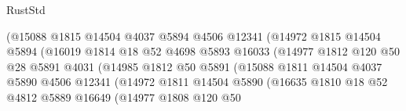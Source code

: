 \begin{lexlean}{RustStd}
\begin{coremodule}
                                    (@15088
                                      @1815
                                      @14504
                                      @4037
                                      @5894
                                      @4506
                                      @12341
                                      (@14972
                                        @1815
                                        @14504
                                        @5894
                                        (@16019
                                          @1814
                                          @18
                                          @52
                                          @4698
                                          @5893
                                          @16033
                                          (@14977
                                            @1812
                                            @120
                                            @50
                                            @28
                                            @5891
                                            @4031
                                            (@14985
                                              @1812
                                              @50
                                              @5891
                                              (@15088
                                                @1811
                                                @14504
                                                @4037
                                                @5890
                                                @4506
                                                @12341
                                                (@14972
                                                  @1811
                                                  @14504
                                                  @5890
                                                  (@16635
                                                    @1810
                                                    @18
                                                    @52
                                                    @4812
                                                    @5889
                                                    @16649
                                                    (@14977
                                                      @1808
                                                      @120
                                                      @50

\end{coremodule}
\end{lexlean}
